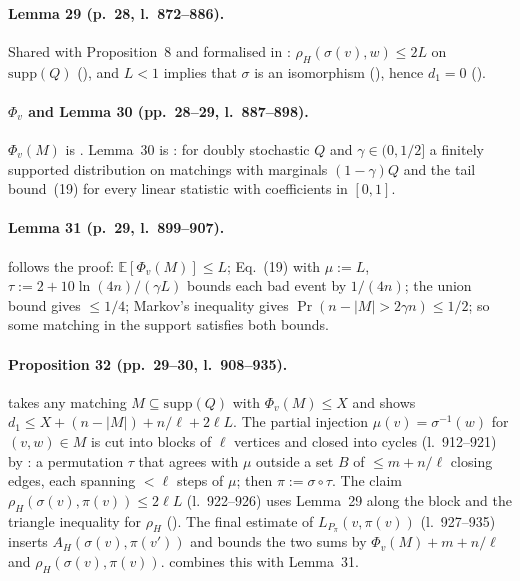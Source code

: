 \paragraph{Lemma 29 (p.~28, l.~872--886).} Shared with Proposition~8 and formalised in
: $\rho_H(\sigma(v),w)\le2L$ on $\mathrm{supp}(Q)$ (), and $L<1$
implies that $\sigma$ is an isomorphism (), hence $d_1=0$ ().

\paragraph{$\Phi_v$ and Lemma 30 (pp.~28--29, l.~887--898).} $\Phi_v(M)$ is . Lemma~30 is
: for doubly stochastic $Q$ and $\gamma\in(0,1/2]$ a finitely supported distribution on
matchings with marginals $(1-\gamma)Q$ and the tail bound~(19) for every linear statistic with coefficients in
$[0,1]$.

\paragraph{Lemma 31 (p.~29, l.~899--907).}  follows the proof: $\mathbb E[\Phi_v(M)]\le L$;
Eq.~(19) with $\mu:=L$, $\tau:=2+10\ln(4n)/(\gamma L)$ bounds each bad event by $1/(4n)$; the union bound gives
$\le1/4$; Markov's inequality gives $\Pr(n-|M|>2\gamma n)\le1/2$; so some matching in the support satisfies
both bounds.

\paragraph{Proposition 32 (pp.~29--30, l.~908--935).}  takes any matching
$M\subseteq\mathrm{supp}(Q)$ with $\Phi_v(M)\le X$ and shows $d_1\le X+(n-|M|)+n/\ell+2\ell L$. The partial
injection $\mu(v)=\sigma^{-1}(w)$ for $(v,w)\in M$ is cut into blocks of $\ell$ vertices and closed into cycles
(l.~912--921) by : a permutation $\tau$ that agrees with $\mu$ outside
a set $B$ of $\le m+n/\ell$ closing edges, each spanning $<\ell$ steps of $\mu$; then $\pi:=\sigma\circ\tau$.
The claim $\rho_H(\sigma(v),\pi(v))\le2\ell L$ (l.~922--926) uses Lemma~29 along the block and the triangle
inequality for $\rho_H$ (). The final estimate of $L_{P_\pi}(v,\pi(v))$ (l.~927--935)
inserts $A_H(\sigma(v),\pi(v'))$ and bounds the two sums by $\Phi_v(M)+m+n/\ell$ and $\rho_H(\sigma(v),\pi(v))$.
 combines this with Lemma~31.

